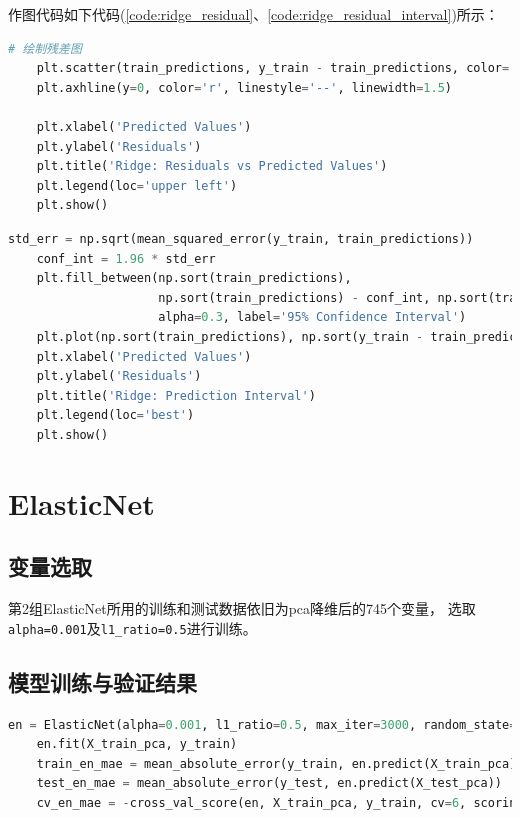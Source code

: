 \documentclass[
    report,     %
    oneside,    %
    UTF8,       %
    zihao=-4    %
]{config} %
\begin{document}
作图代码如下代码(\ref{code:ridge_residual}、\ref{code:ridge_residual_interval})所示：
\begin{lstlisting}[label=code:ridge_residual, language=Python, caption=Ridge模型训练集残差可视化图\ref{fig:Ridge_residual}]
    # 绘制残差图
    plt.scatter(train_predictions, y_train - train_predictions, color='blue',alpha=0.4, label='Residuals')
    plt.axhline(y=0, color='r', linestyle='--', linewidth=1.5)
    
    plt.xlabel('Predicted Values')
    plt.ylabel('Residuals')
    plt.title('Ridge: Residuals vs Predicted Values')
    plt.legend(loc='upper left')
    plt.show()
\end{lstlisting}
\begin{lstlisting}[label=code:ridge_residual_interval, language=Python, caption=Ridge模型训练集残差与95\%置信区间可视化图\ref{fig:Ridge_residual_interval}]
    std_err = np.sqrt(mean_squared_error(y_train, train_predictions))
    conf_int = 1.96 * std_err
    plt.fill_between(np.sort(train_predictions), 
                     np.sort(train_predictions) - conf_int, np.sort(train_predictions) + conf_int, color='gray', 
                     alpha=0.3, label='95% Confidence Interval')
    plt.plot(np.sort(train_predictions), np.sort(y_train - train_predictions), color='blue', label='Residuals')
    plt.xlabel('Predicted Values')
    plt.ylabel('Residuals')
    plt.title('Ridge: Prediction Interval')
    plt.legend(loc='best')
    plt.show()
\end{lstlisting}

\section{ElasticNet}

\subsection{变量选取}
第2组ElasticNet所用的训练和测试数据依旧为pca降维后的745个变量，
选取\lstinline|alpha=0.001|及\lstinline|l1_ratio=0.5|进行训练。

\subsection{模型训练与验证结果}

\begin{lstlisting}[label=code:elasticnet_model, language=Python, caption=ElasticNet模型训练]
    en = ElasticNet(alpha=0.001, l1_ratio=0.5, max_iter=3000, random_state=42)
    en.fit(X_train_pca, y_train)
    train_en_mae = mean_absolute_error(y_train, en.predict(X_train_pca))   
    test_en_mae = mean_absolute_error(y_test, en.predict(X_test_pca))
    cv_en_mae = -cross_val_score(en, X_train_pca, y_train, cv=6, scoring='neg_mean_absolute_error').mean()
\end{lstlisting}
\end{document}
